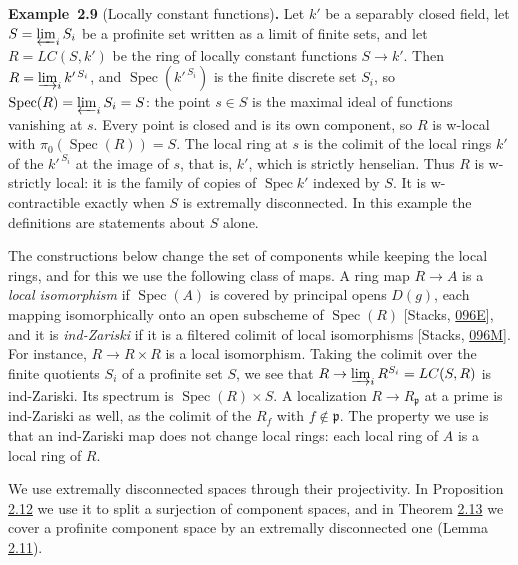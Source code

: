 \documentclass[11pt]{article}
\newenvironment{bpstatement}[2]{\par\addvspace{0.6\baselineskip}\noindent\textbf{#1}#2\textbf{.}\enspace\ignorespaces}
  {\par\addvspace{0.4\baselineskip}}
\begin{document}
\label{bp26}%
\begin{bpstatement}{Example~2.9}{ (Locally constant functions)}
Let \(k'\) be a separably closed field, let \(S=\varprojlim_iS_i\) be a profinite set written as a limit of finite sets, and let \(R=LC(S,k')\) be the ring of locally constant functions \(S\to k'\). Then \(R=\varinjlim_ik'^{\,S_i}\), and \(\operatorname{Spec}(k'^{\,S_i})\) is the finite discrete set \(S_i\), so \(\operatorname{Spec}(R)=\varprojlim_iS_i=S\): the point \(s\in S\) is the maximal ideal of functions vanishing at \(s\). Every point is closed and is its own component, so \(R\) is w-local with \(\pi_0(\operatorname{Spec}(R))=S\). The local ring at \(s\) is the colimit of the local rings \(k'\) of the \(k'^{\,S_i}\) at the image of \(s\), that is, \(k'\), which is strictly henselian. Thus \(R\) is w-strictly local: it is the family of copies of \(\operatorname{Spec}k'\) indexed by \(S\). It is w-contractible exactly when \(S\) is extremally disconnected. In this example the definitions are statements about \(S\) alone.
\end{bpstatement}

\label{bp27}%
The constructions below change the set of components while keeping the local rings, and for this we use the following class of maps. A ring map \(R\to A\) is a \emph{local isomorphism} if \(\operatorname{Spec}(A)\) is covered by principal opens \(D(g)\), each mapping isomorphically onto an open subscheme of \(\operatorname{Spec}(R)\) [Stacks, \href{https://stacks.math.columbia.edu/tag/096E}{096E}], and it is \emph{ind-Zariski} if it is a filtered colimit of local isomorphisms [Stacks, \href{https://stacks.math.columbia.edu/tag/096M}{096M}]. For instance, \(R\to R\times R\) is a local isomorphism. Taking the colimit over the finite quotients \(S_i\) of a profinite set \(S\), we see that \(R\to\varinjlim_iR^{S_i}=LC(S,R)\) is ind-Zariski. Its spectrum is \(\operatorname{Spec}(R)\times S\). A localization \(R\to R_{\mathfrak p}\) at a prime is ind-Zariski as well, as the colimit of the \(R_f\) with \(f\notin\mathfrak p\). The property we use is that an ind-Zariski map does not change local rings: each local ring of \(A\) is a local ring of \(R\).

We use extremally disconnected spaces through their projectivity. In Proposition \hyperref[bp34]{2.12} we use it to split a surjection of component spaces, and in Theorem \hyperref[bp37]{2.13} we cover a profinite component space by an extremally disconnected one (Lemma \hyperref[bp31]{2.11}).
\end{document}
